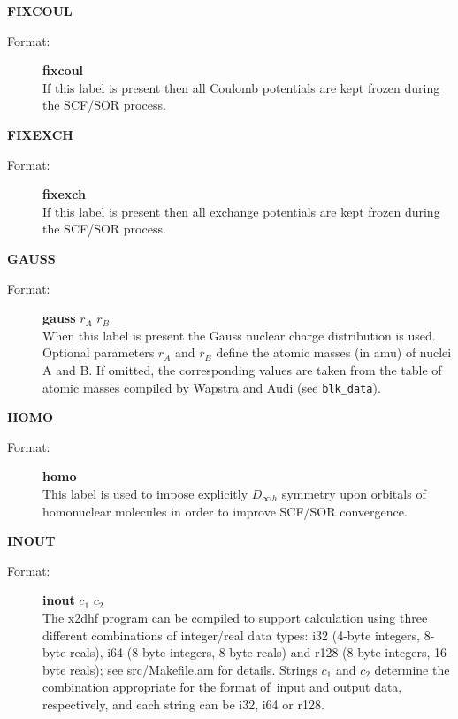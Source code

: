\documentclass[12pt,a4paper]{article}
\newcommand{\ft}[1]{\texttt{#1}}
\begin{document}
\begin{description}
\begin{description}
\end{description}

\item \textbf{FIXCOUL}
\begin{description}
\item[Format:] \textbf{fixcoul}\\ If this label is present then all
  Coulomb potentials are kept frozen during the SCF/SOR process.
\end{description}

\item \textbf{FIXEXCH}
\begin{description}
\item[Format:] \textbf{fixexch}\\ If this label is present then all
  exchange potentials are kept frozen during the SCF/SOR process.
\end{description}


\item \textbf{GAUSS}
\begin{description}
\item[Format:] \textbf{gauss} $r_A$ $r_B$ \\ When this label is present the Gauss nuclear
  charge distribution is used. Optional parameters $r_A$ and $r_B$ define the atomic
  masses (in amu) of nuclei A and B. If omitted, the corresponding values are taken from
  the table of atomic masses compiled by Wapstra and Audi (see \ft{blk\_data}).
\end{description}

\item \textbf{HOMO}
\begin{description}
\item[Format:] \textbf{homo}  \\
This label is used to impose explicitly $D_{\infty\,h}$ symmetry upon orbitals
of homonuclear molecules in order to improve SCF/SOR convergence.
\end{description}


\item \textbf{INOUT}
\begin{description}
\item[Format:] \textbf{inout} $c_1$ $c_2$\\ The x2dhf program can be compiled to support
  calculation using three different combinations of integer/real data types: i32 (4-byte
  integers, 8-byte reals), i64 (8-byte integers, 8-byte reals) and r128 (8-byte integers,
  16-byte reals); see src/Makefile.am for details.  Strings $c_1$ and $c_2$ determine the
  combination appropriate for the format of~input and output data, respectively, and each
  string can be i32, i64 or r128.


\end{description}
\end{description}
\end{document}
